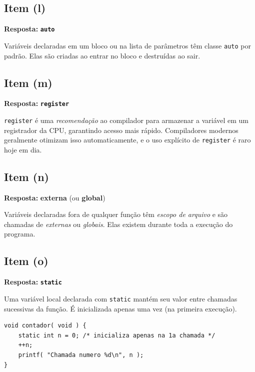 \documentclass[12pt,a4paper]{article}
\begin{document}
\subsection*{Item (l)}
\begin{respostabox}
\textbf{Resposta:} \textcolor{deitelblue}{\textbf{\texttt{auto}}}

Variáveis declaradas em um bloco ou na lista de parâmetros têm classe \texttt{auto}
por padrão. Elas são criadas ao entrar no bloco e destruídas ao sair.
\end{respostabox}

\subsection*{Item (m)}
\begin{respostabox}
\textbf{Resposta:} \textcolor{deitelblue}{\textbf{\texttt{register}}}

\texttt{register} é uma \textit{recomendação} ao compilador para armazenar a variável
em um registrador da CPU, garantindo acesso mais rápido. Compiladores modernos
geralmente otimizam isso automaticamente, e o uso explícito de \texttt{register}
é raro hoje em dia.
\end{respostabox}

\subsection*{Item (n)}
\begin{respostabox}
\textbf{Resposta:} \textcolor{deitelblue}{\textbf{externa} (ou \textbf{global})}

Variáveis declaradas fora de qualquer função têm \textit{escopo de arquivo} e são
chamadas de \textit{externas} ou \textit{globais}. Elas existem durante toda a
execução do programa.
\end{respostabox}

\subsection*{Item (o)}
\begin{respostabox}
\textbf{Resposta:} \textcolor{deitelblue}{\textbf{\texttt{static}}}

Uma variável local declarada com \texttt{static} mantém seu valor entre chamadas
sucessivas da função. É inicializada apenas uma vez (na primeira execução).
\begin{lstlisting}
void contador( void ) {
    static int n = 0; /* inicializa apenas na 1a chamada */
    ++n;
    printf( "Chamada numero %d\n", n );
}
\end{lstlisting}
\end{respostabox}
\end{document}
